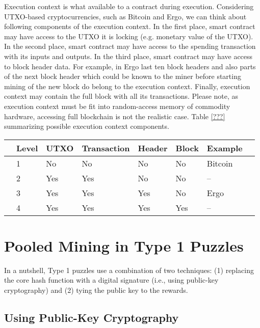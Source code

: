 \documentclass[11pt]{article}
\newcommand{\authnote}[2]{\marginpar{\parbox{\marginparwidth}{\tiny %
  \textsf{#1 {\textcolor{blue}{notes: #2}}}}}%
  \textcolor{blue}{\textbf{\dag}}}
\newcommand{\authnote}[2]{
  \textsf{#1 \textcolor{blue}{: #2}}}
\newcommand{\authnote}[2]{}
\newcommand{\snote}[1]{{\authnote{\textcolor{yellow}{Scalahub notes}}{#1}}}
\newcommand{\powname}{Autolykos\xspace}
\begin{document}
Execution context is what available to a contract during execution. Considering UTXO-based cryptocurrencies, such as
Bitcoin and Ergo, we can think about following components of the execution context. In the first place, smart contract
 may have access to the UTXO it is locking (e.g. monetary value of the UTXO). In the second place, smart contract may
 have access to the spending transaction with its inputs and outputs. In the third place, smart contract may have access
 to block header data. For example, in Ergo last ten block headers and also parts of the next block header which could
 be known to the miner before starting mining of the new block do belong to the execution context. Finally, execution
 context may contain the full block with all its transactions. Please note, as execution context must be fit into
 random-access memory of commodity hardware, accessing full blockchain is not the realistic case. Table \ref{???}
 summarizing possible execution context components.


\begin{tabular}{llllllll}
	& Level & UTXO & Transaction & Header      & Block & Example \\ \hline
	& 1     & No  & No          & No  		   & No    & Bitcoin \\
	& 2     & Yes & Yes         & No 		   & No    & -- \\
	& 3     & Yes & Yes         & Yes 		   & No    & Ergo    \\
	& 4     & Yes & Yes         & Yes 		   & Yes   & --    \\
\end{tabular}
	
\section{Pooled Mining in Type 1 Puzzles}


In a nutshell, Type 1 puzzles use a combination of two techniques: (1) replacing the core hash function with a digital signature (i.e., using public-key cryptography) and (2) tying the public key to the rewards.

\subsection{Using Public-Key Cryptography}
\end{document}
